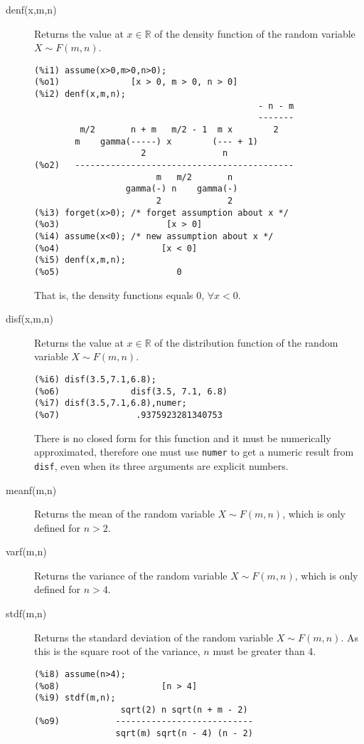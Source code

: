 \documentclass[12pt,a4paper]{article}
\newcommand{\R}{\mathbb{R}}
\begin{document}
\begin{description}

\item[denf(x,m,n)] Returns the value at $x \in \R$ of the density function of the random variable $X \sim F(m,n)$.

\begin{verbatim}
(%i1) assume(x>0,m>0,n>0);
(%o1)              [x > 0, m > 0, n > 0]
(%i2) denf(x,m,n);
                                            - n - m
                                            -------
         m/2       n + m   m/2 - 1  m x        2
        m    gamma(-----) x        (--- + 1)
                     2               n
(%o2)   -------------------------------------------
                        m   m/2       n
                  gamma(-) n    gamma(-)
                        2             2
(%i3) forget(x>0); /* forget assumption about x */
(%o3)                     [x > 0]
(%i4) assume(x<0); /* new assumption about x */
(%o4)                    [x < 0]
(%i5) denf(x,m,n);
(%o5)                       0
\end{verbatim}
That is, the density functions equals 0, $\forall x < 0$.

\item[disf(x,m,n)] Returns the value at $x \in \R$ of the distribution function of the random variable $X \sim F(m,n)$.

\begin{verbatim}
(%i6) disf(3.5,7.1,6.8);
(%o6)              disf(3.5, 7.1, 6.8)
(%i7) disf(3.5,7.1,6.8),numer;
(%o7)               .9375923281340753
\end{verbatim}
There is no closed form for this function and it must be numerically approximated, therefore one must use \verb|numer| to get a numeric result from \verb|disf|, even when its three arguments are explicit numbers.

\item[meanf(m,n)] Returns the mean of the random variable $X \sim F(m,n)$, which is only defined for $n>2$.

\item[varf(m,n)] Returns the variance of the random variable $X \sim F(m,n)$, which is only defined for $n>4$.

\item[stdf(m,n)] Returns the standard deviation of the random variable $X \sim F(m,n)$. As this is the square root of the variance, $n$ must be greater than 4.

\begin{verbatim}
(%i8) assume(n>4);
(%o8)                    [n > 4]
(%i9) stdf(m,n);
                 sqrt(2) n sqrt(n + m - 2)
(%o9)           ---------------------------
                sqrt(m) sqrt(n - 4) (n - 2)
\end{verbatim}


\end{description}
\end{document}
